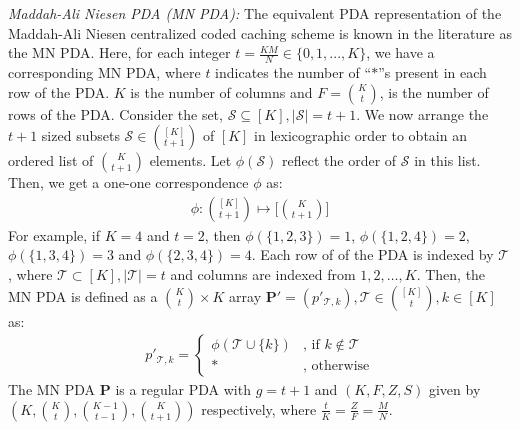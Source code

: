 \documentclass[conference]{IEEEtran}
\begin{document}
\par{\emph{Maddah-Ali Niesen PDA (MN PDA)\cite{PDAmain}:}}
The equivalent PDA representation of the Maddah-Ali Niesen centralized coded caching scheme \cite{MaNcentCc} is known in the literature as the MN PDA. Here, for each integer $t=\frac{KM}{N}\in\{0,1,...,K\}$, we have a corresponding MN PDA, where $t$ indicates the number of ``$*$''s present in each row of the PDA. $K$ is the number of columns and $F=\binom{K}{t}$, is the number of rows of the PDA. Consider the set, $\mathcal{S}\subseteq[K],|\mathcal{S}|=t+1$. We now arrange the $t+1$ sized subsets $\mathcal{S}\in \binom{[K]}{t+1}$ of $[K]$ in lexicographic order to obtain an ordered list of $\binom{K}{t+1}$ elements. Let $\phi(\mathcal{S})$ reflect the order of $\mathcal{S}$ in this list.  Then, we get a one-one correspondence $\phi$ as:
\begin{align}\phi:\binom{[K]}{t+1}\mapsto \Bigg[\binom{K}{t+1}\Bigg]\end{align}
For example, if $K=4$ and $t=2$, then $\phi(\{1,2,3\})=1$, $\phi(\{1,2,4\})=2$,  $\phi(\{1,3,4\})=3$ and  $\phi(\{2,3,4\})=4$.
Each row of of the PDA is indexed by $\mathcal{T}$, where $\mathcal{T}\subset [K], |\mathcal{T}|=t$ and columns are indexed from $1,2,\ldots, K$. Then, the MN PDA is defined as a $\binom{K}{t}\times K$ array $\mathbf{P'}=(p'_{\mathcal{T},k}),\mathcal{T}\in \binom{[K]}{t}, k\in [K]$ as:
\begin{align*}
p'_{\mathcal{T},k}=
\left\{
\begin{array}{ll}
\phi(\mathcal{T}\cup \{k\}) & \mbox{, if }k\notin\mathcal{T} \\
\mbox{*} &\mbox{, otherwise}
\end{array}
\right.
\end{align*}
The MN PDA $\mathbf{P}$ is a regular PDA with $g=t+1$ and $(K,F,Z,S)$ given by $(K,\binom{K}{t},\binom{K-1}{t-1},\binom{K}{t+1})$ respectively, where $\frac{t}{K}=\frac{Z}{F}=\frac{M}{N}$.
\end{document}
